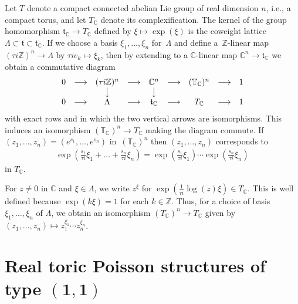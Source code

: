 \documentclass[pdftex]{sigma}
\numberwithin{equation}{section}
\begin{document}
Let $T$ denote a compact connected abelian Lie group of real dimension $n$, i.e., a compact torus, and let $T_{\mathbb C}$ denote its complexif\/ication. The kernel of the group homomorphism ${\mathfrak t}_{\mathbb C}\to T_{\mathbb C}$ def\/ined by $\xi\mapsto \exp(\xi)$ is the coweight lattice $\Lambda\subset {\mathfrak t}\subset {\mathfrak t}_{\mathbb C}$. If we choose a basis $\xi_1,\dots,\xi_n$ for~$\Lambda$ and def\/ine a~${\mathbb Z}$-linear map $(\tau i{\mathbb Z})^n\to \Lambda$ by $\tau ie_k\mapsto \xi_k$, then by extending to a ${\mathbb C}$-linear map ${\mathbb C}^n\to {\mathfrak t}_{\mathbb C}$ we obtain a commutative diagram
\begin{gather*}
\begin{matrix}
0 & \longrightarrow & (\tau i{\mathbb Z})^n & \longrightarrow & {\mathbb C}^n & \longrightarrow & ({\mathbb T}_{\mathbb C})^n & \longrightarrow & 1 \\
 & & \big\downarrow & & \big\downarrow & & & & \\
0 & \longrightarrow & \Lambda & \longrightarrow & {\mathfrak t}_{\mathbb C} & \longrightarrow & T_{\mathbb C} & \longrightarrow & 1
\end{matrix}
\end{gather*}
with exact rows and in which the two vertical arrows are isomorphisms. This induces an isomorphism $({\mathbb T}_{\mathbb C})^n\to T_{\mathbb C}$ making the diagram commute. If $(z_1,\dots,z_n)=(e^{s_1},\dots,e^{s_n})$ in~$({\mathbb T}_{\mathbb C})^n$ then $(z_1,\dots,z_n)$ corresponds to
\begin{gather*}
\exp\left(\frac{s_1}{\tau i}\xi_1+\dots+\frac{s_n}{\tau i}\xi_n\right)=\exp\left(\frac{s_1}{\tau i}\xi_1\right)\cdots \exp\left(\frac{s_n}{\tau i}\xi_n\right)
\end{gather*}
in $T_{\mathbb C}$.

\begin{Note}\label{isom_with_std_torus}
For $z\not=0$ in ${\mathbb C}$ and $\xi\in \Lambda$, we write $z^\xi$ for $\exp(\frac{1}{\tau i}\log(z)\xi)\in T_{\mathbb C}$. This is well def\/ined because $\exp(k\xi)=1$ for each $k\in{\mathbb Z}$. Thus, for a choice of basis $\xi_1,\dots,\xi_n$ of $\Lambda$, we obtain an isomorphism $(T_{\mathbb C})^n\to T_{\mathbb C}$ given by $(z_1,\dots,z_n)\mapsto z_1^{\xi_1}\cdots z_n^{\xi_n}$.
\end{Note}

\section[Real toric Poisson structures of type $(1,1)$]{Real toric Poisson structures of type $\boldsymbol{(1,1)}$}
\end{document}
